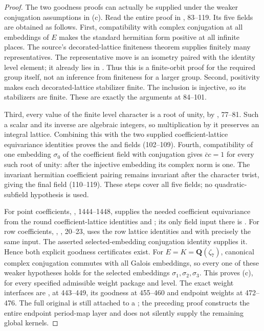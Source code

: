 \begin{proof}
The two goodness proofs can actually be supplied under the weaker
conjugation assumptions in (c).
Read the entire proof  in
, 83--119.
Its five  fields are obtained as follows.
First, compatibility with complex conjugation at all embeddings of $E$
makes the standard hermitian form positive at all infinite places.
The source's decorated-lattice finiteness theorem supplies finitely many
representatives. The representative move is an isometry paired with the
identity level element; it already lies in .
Thus this is a finite-orbit proof for the required group itself, not an
inference from finiteness for a larger group.
Second, positivity makes each decorated-lattice stabilizer finite.
The inclusion  is injective, so its stabilizers are finite.
These are exactly the arguments at 84--101.

Third, every value of the finite level character is a root of unity,
by , 77--81.
Such a scalar and its inverse are algebraic integers, so multiplication
by it preserves an integral lattice.
Combining this with the two supplied coefficient-lattice equivariance
identities proves the  and  fields
(102--109).
Fourth, compatibility of one embedding $\sigma_0$ of the coefficient
field with conjugation gives $\bar c c=1$ for every such root of unity:
after the injective embedding its complex norm is one.
The invariant hermitian coefficient pairing remains invariant after
the character twist, giving the final  field (110--119).
These steps cover all five fields; no quadratic-subfield hypothesis is used.

For point coefficients, , 1444--1448, supplies the
needed coefficient equivariance from the round coefficient-lattice
identities and ; its only field input there is
.
For row coefficients,
, , 20--23,
uses the row lattice identities and  with precisely
the same input.
The asserted selected-embedding conjugation identity supplies it.
Hence both explicit goodness certificates exist.
For $E=K=\mathbf Q(\zeta_7)$, canonical complex conjugation commutes
with all Galois embeddings, so every one of these weaker hypotheses
holds for the selected embeddings $\sigma_1,\sigma_2,\sigma_3$.
This proves (c), for every specified admissible weight package and level.
The exact weight interfaces are ,
 at 443--449, its goodness at 455--460 and endpoint weights
at 472--476.
The full original  is still attached to a
; the preceding proof constructs the entire endpoint
period-map layer and does not silently supply the remaining global kernels.


\end{proof}
